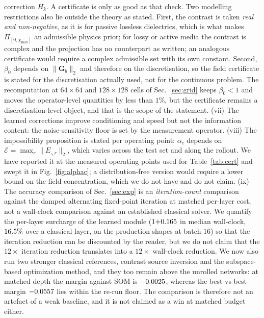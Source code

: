 \documentclass[journal,cmes,article,submit,moreauthors,pdftex]{Definitions/tsp}
\newcommand{\norm}[1]{\lVert #1 \rVert}
\newcommand{\numv}[1]{#1}
\begin{document}
correction $H_k$. A certificate is only as good as that check. Two modelling restrictions also lie
outside the theory as stated. First, the contrast is taken \emph{real and non-negative}, as it is for passive lossless dielectrics, which is what makes $\Pi_{[0,\chi_{\max}]}$ an admissible physics prior; for
lossy or active media the contrast is complex and the projection has no counterpart as written; an
analogous certificate would require a complex admissible set with its own constant.
Second, $\beta_0$ depends on $\norm{\mathbf{G}_b}_2$ and therefore on the discretisation, so the
field certificate is stated for the discretisation actually used, not for the continuous problem.
The recomputation at $64\times64$ and $128\times128$ cells of Sec.~\ref{sec:grid} keeps
$\beta_0<1$ and moves the operator-level quantities by less than $1\%$, but the certificate
remains a discretisation-level object, and that is the scope of the statement.
(vii) The learned corrections improve conditioning and speed but not the information content: the
noise-sensitivity floor is set by the measurement operator.
(viii) The impossibility proposition is stated per operating point: $\alpha_c$ depends on
$\mathcal{E}=\max_r\norm{E_{\cdot,r}}_2$, which varies across the test set and along the rollout. We have reported it at the
measured operating points used for Table~\ref{tab:cert} and swept it in Fig.~\ref{fig:alphac};
a distribution-free version would require a lower bound on the field concentration, which we do not
have and do not claim.
(ix) The accuracy comparison of Sec.~\ref{sec:exp} is an \emph{iteration-count} comparison against
the damped alternating fixed-point iteration at matched per-layer cost, not a wall-clock comparison
against an established classical solver. We quantify the per-layer surcharge of the learned
module ($1{+}\numv{\NumCostLayerOverhead}$ in median wall-clock, $\numv{\NumCostLayerOverheadPct}\%$
over a classical layer, on the production shapes at batch $16$) so that the iteration reduction can
be discounted by the reader, but we do not claim that the $12\times$ iteration reduction translates
into a $12\times$ wall-clock reduction. We now also run two stronger classical references, 
contrast source inversion and the subspace-based optimization method, and they too remain above
the unrolled networks: at matched depth the margin against SOM is
$\numv{\NumSomMargKEight}$, whereas the best-vs-best margin $\numv{\NumSomMargBest}$ lies within
the re-run floor. The comparison is therefore not an artefact of a weak baseline, and it is not
claimed as a win at matched budget either.
\end{document}
